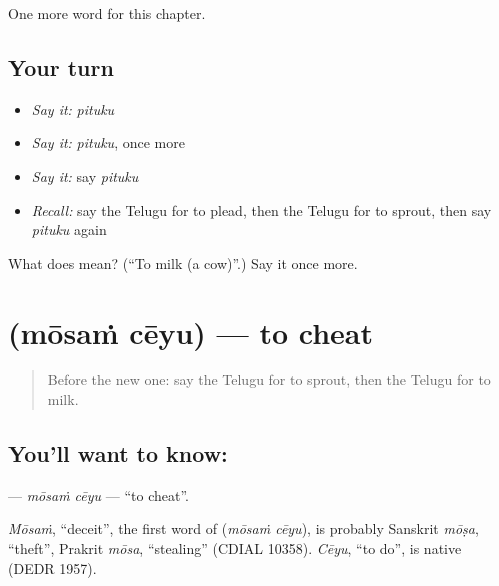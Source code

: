 \begin{grammarlens}[title={What you've built}]
One more word for this chapter.
\end{grammarlens}

\subsection*{Your turn}
\begin{itemize}
\raggedright
  \item \emph{Say it:} \emph{pituku}
  \item \emph{Say it:} \emph{pituku}, once more
  \item \emph{Say it:} say \emph{pituku}
  \item \emph{Recall:} say the Telugu for to plead, then the Telugu for to sprout, then say \emph{pituku} again
\end{itemize}

\begin{tcolorbox}[breakable,colback=teal!4,colframe=teal!35!black,title={Before you move on}]
What does  mean? (\textquotedblleft{}To milk (a cow)\textquotedblright{}.) Say it once more.
\end{tcolorbox}
\section[\texorpdfstring{\te{మోసం} \te{చేయు} (mōsaṁ cēyu)}{మోసం చేయు (mōsaṁ cēyu)}]{  (mōsaṁ cēyu) — to cheat}

\label{lesson:TE-C248-mosam-ceyu}



\begin{quote}
Before the new one: say the Telugu for to sprout, then the Telugu for to milk.
\end{quote}

\subsection*{You'll want to know:  }
\textbf{ } — \emph{mōsaṁ cēyu} — \textquotedblleft{}to cheat\textquotedblright{}.

\begin{cousinweb}
\emph{Mōsaṁ}, \textquotedblleft{}deceit\textquotedblright{}, the first word of \textbf{ } (\emph{mōsaṁ cēyu}), is probably Sanskrit \emph{mōṣa}, \textquotedblleft{}theft\textquotedblright{}, Prakrit \emph{mōsa}, \textquotedblleft{}stealing\textquotedblright{} (CDIAL 10358). \emph{Cēyu}, \textquotedblleft{}to do\textquotedblright{}, is native (DEDR 1957).
\end{cousinweb}

